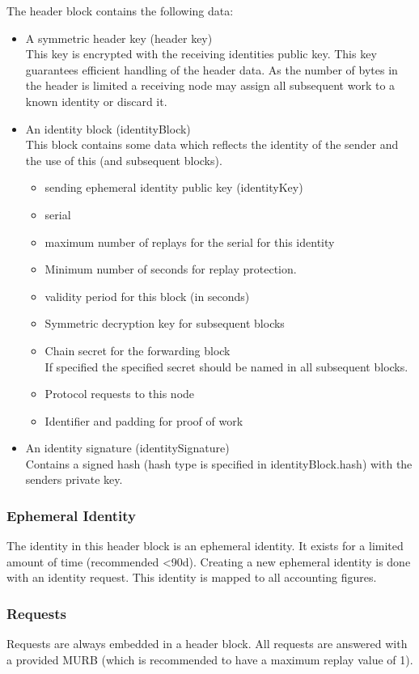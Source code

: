 The header block contains the following data:
\begin{itemize}
	\item A symmetric header key (header key)\\
	This key is encrypted with the receiving identities public key. This key guarantees efficient handling of the header data. As the number of bytes in the header is limited a receiving node may assign all subsequent work to a known identity or discard it.
	\item An identity block (identityBlock)\\
	This block contains some data which reflects the identity of the sender and the use of this (and subsequent blocks).
	\begin{itemize}
		\item sending ephemeral identity public key (identityKey)
		\item serial
		\item maximum number of replays for the serial for this identity
		\item Minimum number of seconds for replay protection.
		\item validity period for this block (in seconds)
		\item Symmetric decryption key for subsequent blocks
		\item Chain secret for the forwarding block\\
		If specified the specified secret should be named in all subsequent blocks.
		\item Protocol requests to this node
		\item Identifier and padding for proof of work
	\end{itemize}
	\item An identity signature (identitySignature)\\
	Contains a signed hash (hash type is specified in identityBlock.hash) with the senders private key.
\end{itemize}

\subsubsection{Ephemeral Identity}
The identity in this header block is an ephemeral identity. It exists for a limited amount of time (recommended <90d). Creating a new ephemeral identity is done with an identity request. This identity is mapped to all accounting figures.

\subsubsection{Requests\label{sec:request}}
Requests are always embedded in a header block. All requests are answered with a provided MURB (which is recommended to have a maximum replay value of 1).

